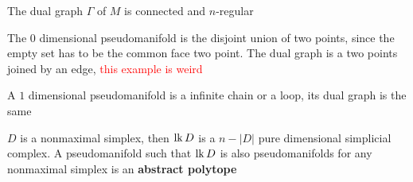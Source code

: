 \documentclass[main]{subfiles}
\begin{document}
\begin{note}
The dual graph $\Gamma$ of $M$ is connected and $n$-regular
\end{note}

\begin{example}
The $0$ dimensional pseudomanifold is the disjoint union of two points, since the empty set has to be the common face two point. The dual graph is a two points joined by an edge, \textcolor{red}{this example is weird} \par
A $1$ dimensional pseudomanifold is a infinite chain or a loop, its dual graph is the same
\end{example}

\begin{definition}
$D$ is a nonmaximal simplex, then $\operatorname{lk} D$ is a $n-|D|$ pure dimensional simplicial complex. A pseudomanifold such that $\operatorname{lk} D$ is also pseudomanifolds for any nonmaximal simplex is an \textbf{abstract polytope}
\end{definition}
\end{document}
